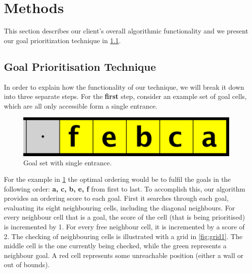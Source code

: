 \section{Methods}
\label{sec:methods}


This section describes our client's overall algorithmic functionality and we present our goal prioritization technique in \cref{methods:goal_ordering}.

\subsection{Goal Prioritisation Technique}
\label{methods:goal_ordering}

In order to explain how the functionality of our technique, we will break it down into three separate steps.
For the \textbf{first} step, consider an example set of goal cells, which are all only accessible form a single entrance. 

\begin{figure}[h!]
  \centering
  \includegraphics[width=.5\columnwidth]{graphics/ie_level.png}
  \caption{\label{fig:sample}Goal set with single entrance.}
\end{figure}

For the example in \cref{fig:sample} the optimal ordering would be to fulfil the goals in the following order: \textbf{a, c, b, e, f} from first to last. 
To accomplish this, our algorithm provides an ordering score to each goal. 
First it searches through each goal, evaluating its eight neighbouring cells, including the diagonal neighbours. 
For every neighbour cell that is a goal, the score of the cell (that is being prioritised) is incremented by 1.
For every free neighbour cell, it is incremented by a score of 2. 
The checking of neighbouring cells is illustrated with a grid in \cref{fig:grid1}. 
The middle cell is the one currently being checked, while the green represents a neighbour goal. 
A red cell represents some unreachable position (either a wall or out of bounds).

